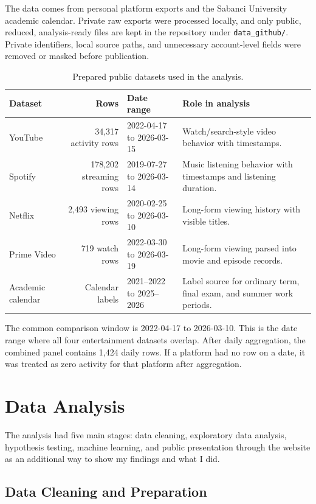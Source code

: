 \documentclass[11pt,a4paper]{article}
\begin{document}
The data comes from personal platform exports and the Sabanci University academic calendar. Private raw exports were processed locally, and only public, reduced, analysis-ready files are kept in the repository under \texttt{data\_github/}. Private identifiers, local source paths, and unnecessary account-level fields were removed or masked before publication.

\begin{table}[H]
\centering
\small
\caption{Prepared public datasets used in the analysis.}
\label{tab:datasets}
\begin{tabularx}{\textwidth}{l r l X}
\toprule
\textbf{Dataset} & \textbf{Rows} & \textbf{Date range} & \textbf{Role in analysis}\\
\midrule
YouTube & 34,317 activity rows & 2022-04-17 to 2026-03-15 & Watch/search-style video behavior with timestamps.\\
Spotify & 178,202 streaming rows & 2019-07-27 to 2026-03-14 & Music listening behavior with timestamps and listening duration.\\
Netflix & 2,493 viewing rows & 2020-02-25 to 2026-03-10 & Long-form viewing history with visible titles.\\
Prime Video & 719 watch rows & 2022-03-30 to 2026-03-19 & Long-form viewing parsed into movie and episode records.\\
Academic calendar & Calendar labels & 2021--2022 to 2025--2026 & Label source for ordinary term, final exam, and summer work periods.\\
\bottomrule
\end{tabularx}
\end{table}

The common comparison window is 2022-04-17 to 2026-03-10. This is the date range where all four entertainment datasets overlap. After daily aggregation, the combined panel contains 1,424 daily rows. If a platform had no row on a date, it was treated as zero activity for that platform after aggregation.

\section{Data Analysis}

The analysis had five main stages: data cleaning, exploratory data analysis, hypothesis testing, machine learning, and public presentation through the website as an additional way to show my findings and what I did.

\subsection{Data Cleaning and Preparation}
\end{document}
